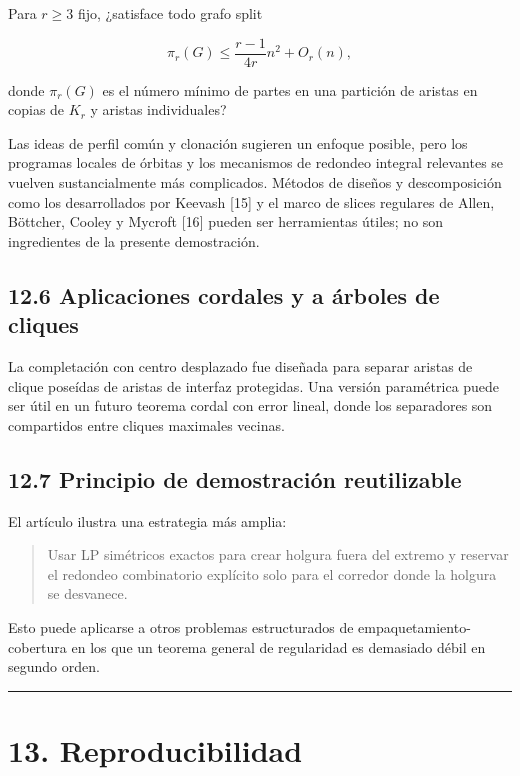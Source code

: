 \documentclass[
  11pt,
]{article}
\begin{document}
Para \(r\ge3\) fijo, ¿satisface todo grafo split

\[
\pi_r(G)
\le
\frac{r-1}{4r}n^2+O_r(n),
\]

donde \(\pi_r(G)\) es el número mínimo de partes en una partición de aristas en copias de \(K_r\) y aristas individuales?

Las ideas de perfil común y clonación sugieren un enfoque posible, pero los programas locales de órbitas y los mecanismos de redondeo integral relevantes se vuelven sustancialmente más complicados. Métodos de diseños y descomposición como los desarrollados por Keevash {[}15{]} y el marco de slices regulares de Allen, Böttcher, Cooley y Mycroft {[}16{]} pueden ser herramientas útiles; no son ingredientes de la presente demostración.

\subsection{12.6 Aplicaciones cordales y a árboles de cliques}\label{aplicaciones-cordales-y-a-uxe1rboles-de-cliques}

La completación con centro desplazado fue diseñada para separar aristas de clique poseídas de aristas de interfaz protegidas. Una versión paramétrica puede ser útil en un futuro teorema cordal con error lineal, donde los separadores son compartidos entre cliques maximales vecinas.

\subsection{12.7 Principio de demostración reutilizable}\label{principio-de-demostraciuxf3n-reutilizable}

El artículo ilustra una estrategia más amplia:

\begin{quote}
Usar LP simétricos exactos para crear holgura fuera del extremo y reservar el redondeo combinatorio explícito solo para el corredor donde la holgura se desvanece.
\end{quote}

Esto puede aplicarse a otros problemas estructurados de empaquetamiento-cobertura en los que un teorema general de regularidad es demasiado débil en segundo orden.

\begin{center}\rule{0.5\linewidth}{0.5pt}\end{center}

\section{13. Reproducibilidad}\label{reproducibilidad}
\end{document}
